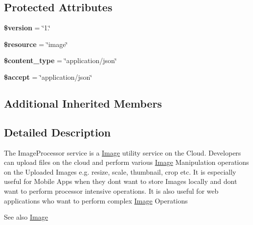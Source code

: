 \subsection*{Protected Attributes}
\begin{DoxyCompactItemize}
\item 
\hypertarget{class_image_processor_service_a17c8948c68aa44fa9961ae169b6a8961}{{\bfseries \$version} = \char`\"{}1.\char`\"{}}\label{class_image_processor_service_a17c8948c68aa44fa9961ae169b6a8961}

\item 
\hypertarget{class_image_processor_service_abd4c7b8b084214b8d2533ba07fce6b83}{{\bfseries \$resource} = \char`\"{}image\char`\"{}}\label{class_image_processor_service_abd4c7b8b084214b8d2533ba07fce6b83}

\item 
\hypertarget{class_image_processor_service_ae754d6373f275e781f47c8bc9b994b6d}{{\bfseries \$content\+\_\+type} = \char`\"{}application/json\char`\"{}}\label{class_image_processor_service_ae754d6373f275e781f47c8bc9b994b6d}

\item 
\hypertarget{class_image_processor_service_a75fc18c4ff06288ff9fdf8aba9bd1081}{{\bfseries \$accept} = \char`\"{}application/json\char`\"{}}\label{class_image_processor_service_a75fc18c4ff06288ff9fdf8aba9bd1081}

\end{DoxyCompactItemize}
\subsection*{Additional Inherited Members}


\subsection{Detailed Description}
The Image\+Processor service is a \hyperlink{class_image}{Image} utility service on the Cloud. Developers can upload files on the cloud and perform various \hyperlink{class_image}{Image} Manipulation operations on the Uploaded Images e.\+g. resize, scale, thumbnail, crop etc. It is especially useful for Mobile Apps when they dont want to store Images locally and dont want to perform processor intensive operations. It is also useful for web applications who want to perform complex \hyperlink{class_image}{Image} Operations

\begin{DoxySeeAlso}{See also}
\hyperlink{class_image}{Image} 
\end{DoxySeeAlso}


